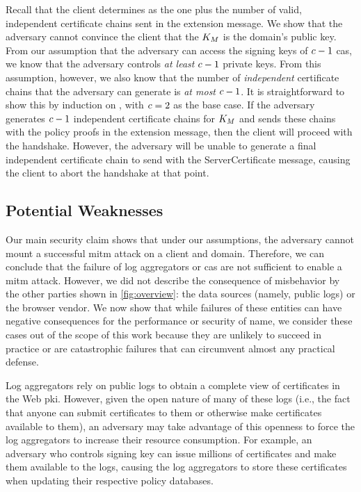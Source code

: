 Recall that the client determines \policy as the one plus the number of valid,
independent certificate chains sent in the extension message. We show that the
adversary cannot convince the client that the $K_M$ is the domain's
public key. From our assumption that the adversary can access the signing keys
of $c - 1$ \acp{ca}, we know that the adversary controls \emph{at least}
$c - 1$ private keys. From this assumption, however, we also know that the
number of \emph{independent} certificate chains that the adversary can generate
is \emph{at most} $c - 1$. It is straightforward to show this by induction
on \policy, with $c = 2$ as the base case. If the adversary generates $c - 1$
independent certificate chains for $K_M$ and sends these chains with
the policy proofs in the extension message, then the client will proceed with
the handshake. However, the adversary will be unable to generate a final
independent certificate chain to send with the ServerCertificate message,
causing the client to abort the handshake at that point.


\subsection{Potential Weaknesses}
\label{sec:analysis:weaknesses}

Our main security claim shows that under our assumptions, the adversary cannot
mount a successful \ac{mitm} attack on a client and domain. Therefore, we can
conclude that the failure of log aggregators or \acp{ca} are not sufficient to
enable a \ac{mitm} attack. However, we did not describe the consequence of
misbehavior by the other parties shown in \autoref{fig:overview}: the data
sources (namely, public logs) or the browser vendor. We now show that while
failures of these entities can have negative consequences for the performance or
security of \ac{name}, we consider these cases out of the scope of this work
because they are unlikely to succeed in practice or are catastrophic failures
that can circumvent almost any practical defense.

Log aggregators rely on public logs to obtain a complete view of certificates in
the Web \ac{pki}. However, given the open nature of many of these logs (i.e.,
the fact that anyone can submit certificates to them or otherwise make
certificates available to them), an adversary may take advantage of this
openness to force the log aggregators to increase their resource consumption.
For example, an adversary who controls  signing key can issue millions
of certificates and make them available to the logs, causing the log aggregators
to store these certificates when updating their respective policy databases.


